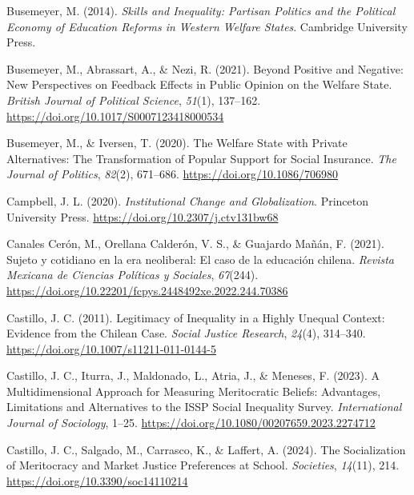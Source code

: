 \documentclass[
  12pt,
]{article}
\newlength{\cslhangindent}
\newenvironment{CSLReferences}[2] %
 {\begin{list}{}{%
  \setlength{\itemindent}{0pt}
  \setlength{\leftmargin}{0pt}
  \setlength{\parsep}{0pt}
  \ifodd #1
   \setlength{\leftmargin}{\cslhangindent}
   \setlength{\itemindent}{-1\cslhangindent}
  \fi
  \setlength{\itemsep}{#2\baselineskip}}}
 {\end{list}}
\begin{document}
\begin{CSLReferences}{1}{0}
Busemeyer, M. (2014). \emph{Skills and {Inequality}: {Partisan Politics}
and the {Political Economy} of {Education Reforms} in {Western Welfare
States}}. Cambridge University Press.

Busemeyer, M., Abrassart, A., \& Nezi, R. (2021). Beyond {Positive} and
{Negative}: {New Perspectives} on {Feedback Effects} in {Public Opinion}
on the {Welfare State}. \emph{British Journal of Political Science},
\emph{51}(1), 137--162. \url{https://doi.org/10.1017/S0007123418000534}

Busemeyer, M., \& Iversen, T. (2020). The {Welfare State} with {Private
Alternatives}: {The Transformation} of {Popular Support} for {Social
Insurance}. \emph{The Journal of Politics}, \emph{82}(2), 671--686.
\url{https://doi.org/10.1086/706980}

Campbell, J. L. (2020). \emph{Institutional {Change} and
{Globalization}}. Princeton University Press.
\url{https://doi.org/10.2307/j.ctv131bw68}

Canales Cerón, M., Orellana Calderón, V. S., \& Guajardo Mañán, F.
(2021). Sujeto y cotidiano en la era neoliberal: El caso de la
educaci{ó}n chilena. \emph{Revista Mexicana de Ciencias Pol{í}ticas y
Sociales}, \emph{67}(244).
\url{https://doi.org/10.22201/fcpys.2448492xe.2022.244.70386}

Castillo, J. C. (2011). Legitimacy of {Inequality} in a {Highly Unequal
Context}: {Evidence} from the {Chilean Case}. \emph{Social Justice
Research}, \emph{24}(4), 314--340.
\url{https://doi.org/10.1007/s11211-011-0144-5}

Castillo, J. C., Iturra, J., Maldonado, L., Atria, J., \& Meneses, F.
(2023). A {Multidimensional Approach} for {Measuring Meritocratic
Beliefs}: {Advantages}, {Limitations} and {Alternatives} to the {ISSP
Social Inequality Survey}. \emph{International Journal of Sociology},
1--25. \url{https://doi.org/10.1080/00207659.2023.2274712}

Castillo, J. C., Salgado, M., Carrasco, K., \& Laffert, A. (2024). The
{Socialization} of {Meritocracy} and {Market Justice Preferences} at
{School}. \emph{Societies}, \emph{14}(11), 214.
\url{https://doi.org/10.3390/soc14110214}


\end{CSLReferences}
\end{document}
